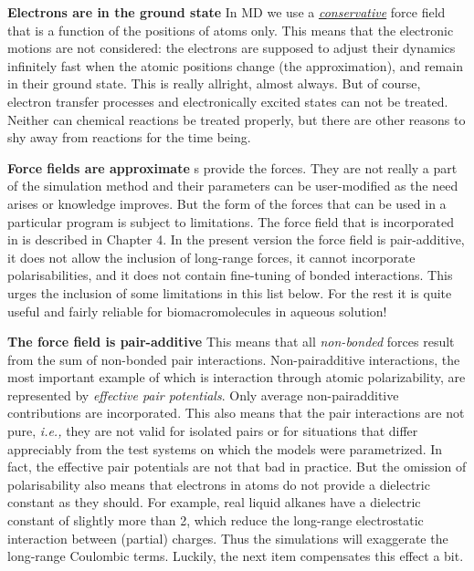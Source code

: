 {\bf Electrons are in the ground state}    
In MD we use a {\em \underline {conservative}} force field that is a
function of the positions of atoms only.  This means that the
electronic motions are not considered: the electrons are supposed to
adjust their dynamics infinitely fast when the atomic positions change
(the {\em {}} approximation), and remain in
their ground state. This is really allright, almost always. But of
course, electron transfer processes and electronically excited states
can not be treated. Neither can chemical reactions be treated
properly, but there are other reasons to shy away from reactions for
the time being.

{\bf Force fields are approximate}
s provide the forces. They are not really a part of the
simulation method and their parameters can be user-modified as the
need arises or knowledge improves. But the form of the forces that can
be used in a particular program is subject to limitations. The force
field that is incorporated in {\gromacs} is described in Chapter 4. In
the present version the force field is pair-additive, it does not
allow the inclusion of long-range forces, it cannot incorporate
polarisabilities, and it does not contain fine-tuning of bonded
interactions. This urges the inclusion of some limitations in this
list below.  For the rest it is quite useful and fairly reliable for
biomacromolecules in aqueous solution!

{\bf The force field is pair-additive} 
This means that all {\em non-bonded} forces result from the sum of
non-bonded pair interactions. Non-pairadditive interactions, the most
important example of which is interaction through atomic
polarizability, are represented by {\em effective pair
potentials}. Only average non-pairadditive contributions are
incorporated. This also means that the pair interactions are not pure,
{\em i.e.,} they are not valid for isolated pairs or for situations
that differ appreciably from the test systems on which the models were
parametrized. In fact, the effective pair potentials are not that bad
in practice. But the omission of polarisability also means that
electrons in atoms do not provide a dielectric constant as they
should. For example, real liquid alkanes have a dielectric constant of
slightly more than 2, which reduce the long-range electrostatic
interaction between (partial) charges. Thus the simulations will
exaggerate the long-range Coulombic terms. Luckily, the next item
compensates this effect a bit.

